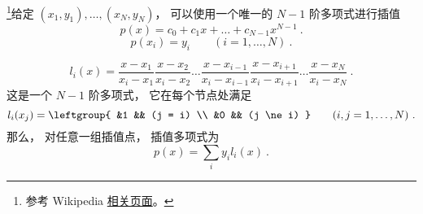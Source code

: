 

\footnote{参考 Wikipedia \href{https://en.wikipedia.org/wiki/Lagrange_polynomial}{相关页面}。}给定 $(x_1, y_1), \dots, (x_N, y_N)$， 可以使用一个唯一的 $N-1$ 阶多项式进行插值
\begin{equation}
p(x) = c_0 + c_1x + \dots + c_{N-1}x^{N-1}~.
\end{equation}
\begin{equation}
p(x_i) = y_i \qquad (i=1,\dots,N)~.
\end{equation}



\begin{equation}
l_i(x) = \frac{x-x_1}{x_i-x_1} \frac{x-x_2}{x_i-x_2}  \dots \frac{x-x_{i-1}}{x_i-x_{i-1}}\frac{x-x_{i+1}}{x_i-x_{i+1}} \dots \frac{x-x_N}{x_i-x_N}~.
\end{equation}
这是一个 $N-1$ 阶多项式， 它在每个节点处满足
\begin{equation}
l_i(x_j) = \leftgroup{
&1 && (j = i) \\
&0 && (j \ne i)
} \qquad (i,j=1,\dots,N)~.
\end{equation}
那么， 对任意一组插值点， 插值多项式为
\begin{equation}
p(x) = \sum_i y_i l_i(x)~.
\end{equation}
